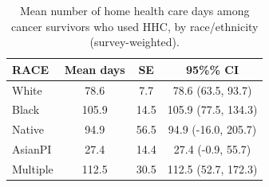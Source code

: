 
\begin{longtable}[t]{lccc}
\caption{\label{tab:tab:days-race}Mean number of home health care days among cancer survivors who used HHC, by race/ethnicity (survey-weighted).}\\
\toprule
RACE & Mean days & SE & 95\%\% CI\\
\midrule
White & 78.6 & 7.7 & 78.6 (63.5, 93.7)\\
Black & 105.9 & 14.5 & 105.9 (77.5, 134.3)\\
Native & 94.9 & 56.5 & 94.9 (-16.0, 205.7)\\
AsianPI & 27.4 & 14.4 & 27.4 (-0.9, 55.7)\\
Multiple & 112.5 & 30.5 & 112.5 (52.7, 172.3)\\
\bottomrule
\end{longtable}
